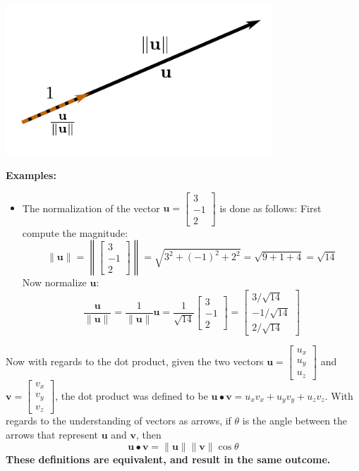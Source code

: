 \documentclass{article}
\begin{document}
\begin{center}
\includegraphics[width = 0.75\textwidth]{displacement_vector_normalization}
\end{center}

\textbf{Examples:}
\begin{itemize}
\item The normalization of the vector \(\mathbf{u} = \begin{bmatrix} 3 \\ -1 \\ 2 \end{bmatrix}\) is done as follows: First compute the magnitude:
\[\|\mathbf{u}\| = \left\|\begin{bmatrix} 3 \\ -1 \\ 2 \end{bmatrix}\right\| = \sqrt{3^2 + (-1)^2 + 2^2} = \sqrt{9 + 1 + 4} = \sqrt{14}\]  
Now normalize \(\mathbf{u}\):
\[\frac{\mathbf{u}}{\|\mathbf{u}\|} 
= \frac{1}{\|\mathbf{u}\|}\mathbf{u}   
= \frac{1}{\sqrt{14}}\begin{bmatrix} 3 \\ -1 \\ 2 \end{bmatrix}
= \begin{bmatrix} 3/\sqrt{14} \\ -1/\sqrt{14} \\ 2/\sqrt{14} \end{bmatrix}\]
\end{itemize}

\vspace{5mm}

Now with regards to the dot product, given the two vectors \(\mathbf{u} = \begin{bmatrix} u_x \\ u_y \\ u_z \end{bmatrix}\) and \(\mathbf{v} = \begin{bmatrix} v_x \\ v_y \\ v_z \end{bmatrix}\), the dot product was defined to be \(\mathbf{u} \bullet \mathbf{v} = u_x v_x + u_y v_y + u_z v_z\). With regards to the understanding of vectors as arrows, if \(\theta\) is the angle between the arrows that represent \(\mathbf{u}\) and \(\mathbf{v}\), then 
\[\mathbf{u} \bullet \mathbf{v} = \|\mathbf{u}\|\|\mathbf{v}\|\cos\theta\]
{\bf These definitions are equivalent, and result in the same outcome.}
\end{document}
